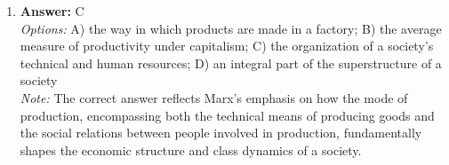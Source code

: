 \documentclass[12pt]{article}
\begin{document}
\begin{enumerate}[label=\arabic*.]
\\ \textit{Note:} The 1990 reform of the National Health Service introduced the concept of self-governing trusts to enhance efficiency and competition among hospitals, allowing them to operate independently and bid for purchasing contracts from health authorities, thereby transforming the landscape of healthcare delivery in the UK.
\item \textbf{Answer:} C
\\ \textit{Options:} A) the way in which products are made in a factory; B) the average measure of productivity under capitalism; C) the organization of a society's technical and human resources; D) an integral part of the superstructure of a society
\\ \textit{Note:} The correct answer reflects Marx's emphasis on how the mode of production, encompassing both the technical means of producing goods and the social relations between people involved in production, fundamentally shapes the economic structure and class dynamics of a society.
\end{enumerate}
\end{document}
